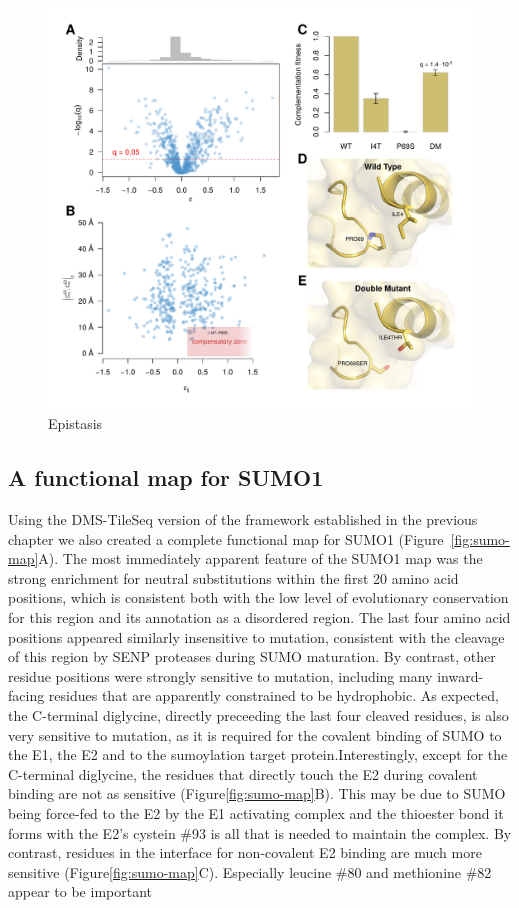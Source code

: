 \begin{figure}[h!]
	\centering
	\includegraphics[width=\textwidth]{img/epistasis.pdf}
	\caption{Epistasis}
	\label{fig:epsistasis}
\end{figure}


\subsection{A functional map for SUMO1}

Using the DMS-TileSeq version of the framework established in the previous chapter we also created a complete functional map for SUMO1 (Figure~\ref{fig:sumo-map}A). The most immediately apparent feature of the SUMO1 map was the strong enrichment for neutral substitutions within the first 20 amino acid positions, which is consistent both with the low level of evolutionary conservation for this region and its annotation as a disordered region. The last four amino acid positions appeared similarly insensitive to mutation, consistent with the cleavage of this region by SENP proteases during SUMO maturation. By contrast, other residue positions were strongly sensitive to mutation, including many inward-facing residues that are apparently constrained to be hydrophobic. As expected, the C-terminal diglycine, directly preceeding the last four cleaved residues, is also very sensitive to mutation, as it is required for the covalent binding of SUMO to the E1, the E2 and to the sumoylation target protein.Interestingly, except for the C-terminal diglycine, the residues that directly touch the E2 during covalent binding are not as sensitive (Figure\ref{fig:sumo-map}B). This may be due to  SUMO being force-fed to the E2 by the E1 activating complex and the thioester bond it forms with the E2's cystein \#93 is all that is needed to maintain the complex. By contrast, residues in the interface for non-covalent E2 binding are much more sensitive (Figure\ref{fig:sumo-map}C). Especially leucine \#80 and methionine \#82 appear to be important

